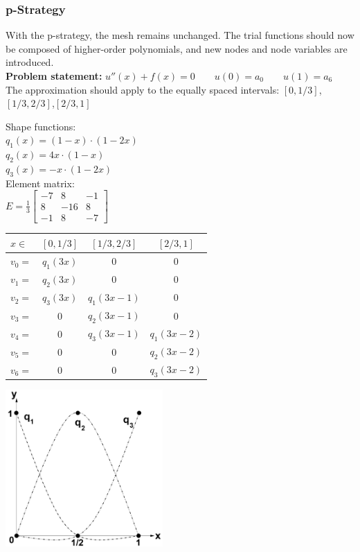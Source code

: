 \subsubsection{p-Strategy}
With the p-strategy, the mesh remains unchanged.
The trial functions should now be composed of higher-order polynomials,
and new nodes and node variables are introduced.\\

\textbf{Problem statement:} $u''(x)+f(x)=0\qquad u(0)=a_0\qquad u(1)=a_6$\\

The approximation should apply to the equally spaced intervals: $[0,1/3]$,\quad $[1/3,2/3]$,\quad $[2/3,1]$\\

\begin{minipage}{4cm}
	Shape functions:\\

	$q_1(x)=(1-x)\cdot(1-2x)$\\
	$q_2(x)=4x\cdot(1-x)$\\
	$q_3(x)=-x\cdot(1-2x)$\\

	Element matrix:\\
	$\boxed{E=\frac{1}{3}
	\begin{bmatrix}
		-7& 8 & -1\\
		8& -16& 8\\
		-1& 8& -7
	\end{bmatrix}}$\\
\end{minipage}
\hfill
\begin{minipage}{8cm}
	\begin{tabular}{lc|c|c}
		$x\in$&$[0,1/3]$&$[1/3,2/3]$&$[2/3,1]$\\
		\hline
		$v_0=$&$q_1(3x)$&$0$&$0$\\
		$v_1=$&$q_2(3x)$&$0$&$0$\\
		$v_2=$&$q_3(3x)$&$q_1(3x-1)$&$0$\\
		$v_3=$&$0$&$q_2(3x-1)$&$0$\\
		$v_4=$&$0$&$q_3(3x-1)$&$q_1(3x-2)$\\
		$v_5=$&$0$&$0$&$q_2(3x-2)$\\
		$v_6=$&$0$&$0$&$q_3(3x-2)$\\
	\end{tabular}
\end{minipage}
\hfill
\begin{minipage}{6cm}
\includegraphics[width=6cm]{Content/02_numerics/FEM2Ord}
\end{minipage}\\

